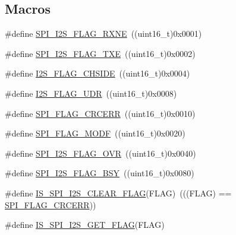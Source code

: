 \subsection*{Macros}
\begin{DoxyCompactItemize}
\item 
\#define \hyperlink{group___s_p_i___i2_s__flags__definition_ga79ee46c44f8886193293528460fea6ed}{S\+P\+I\+\_\+\+I2\+S\+\_\+\+F\+L\+A\+G\+\_\+\+R\+X\+NE}~((uint16\+\_\+t)0x0001)
\item 
\#define \hyperlink{group___s_p_i___i2_s__flags__definition_ga4dbac2dc3e0cfbd7a019ebecc45d66d7}{S\+P\+I\+\_\+\+I2\+S\+\_\+\+F\+L\+A\+G\+\_\+\+T\+XE}~((uint16\+\_\+t)0x0002)
\item 
\#define \hyperlink{group___s_p_i___i2_s__flags__definition_gaf0d629fd522a15aff188236d3254b2ad}{I2\+S\+\_\+\+F\+L\+A\+G\+\_\+\+C\+H\+S\+I\+DE}~((uint16\+\_\+t)0x0004)
\item 
\#define \hyperlink{group___s_p_i___i2_s__flags__definition_gaec08a8ad716bef1b87a8c8d992ab89ec}{I2\+S\+\_\+\+F\+L\+A\+G\+\_\+\+U\+DR}~((uint16\+\_\+t)0x0008)
\item 
\#define \hyperlink{group___s_p_i___i2_s__flags__definition_ga30fb6af50e1f3c61cb9de76b0101c889}{S\+P\+I\+\_\+\+F\+L\+A\+G\+\_\+\+C\+R\+C\+E\+RR}~((uint16\+\_\+t)0x0010)
\item 
\#define \hyperlink{group___s_p_i___i2_s__flags__definition_gac7d3525ab98cc18f02270a4dba685897}{S\+P\+I\+\_\+\+F\+L\+A\+G\+\_\+\+M\+O\+DF}~((uint16\+\_\+t)0x0020)
\item 
\#define \hyperlink{group___s_p_i___i2_s__flags__definition_ga42001f769835f133600a021a29764254}{S\+P\+I\+\_\+\+I2\+S\+\_\+\+F\+L\+A\+G\+\_\+\+O\+VR}~((uint16\+\_\+t)0x0040)
\item 
\#define \hyperlink{group___s_p_i___i2_s__flags__definition_ga4551095df1365cf2a760282a34279b3c}{S\+P\+I\+\_\+\+I2\+S\+\_\+\+F\+L\+A\+G\+\_\+\+B\+SY}~((uint16\+\_\+t)0x0080)
\item 
\#define \hyperlink{group___s_p_i___i2_s__flags__definition_gab16c7f47712871b8f1b97de43841856f}{I\+S\+\_\+\+S\+P\+I\+\_\+\+I2\+S\+\_\+\+C\+L\+E\+A\+R\+\_\+\+F\+L\+AG}(F\+L\+AG)~(((F\+L\+AG) == \hyperlink{group___s_p_i___i2_s__flags__definition_ga30fb6af50e1f3c61cb9de76b0101c889}{S\+P\+I\+\_\+\+F\+L\+A\+G\+\_\+\+C\+R\+C\+E\+RR}))
\item 
\#define \hyperlink{group___s_p_i___i2_s__flags__definition_ga1241471a018bc63ed140089ce8334b4f}{I\+S\+\_\+\+S\+P\+I\+\_\+\+I2\+S\+\_\+\+G\+E\+T\+\_\+\+F\+L\+AG}(F\+L\+AG)
\end{DoxyCompactItemize}


